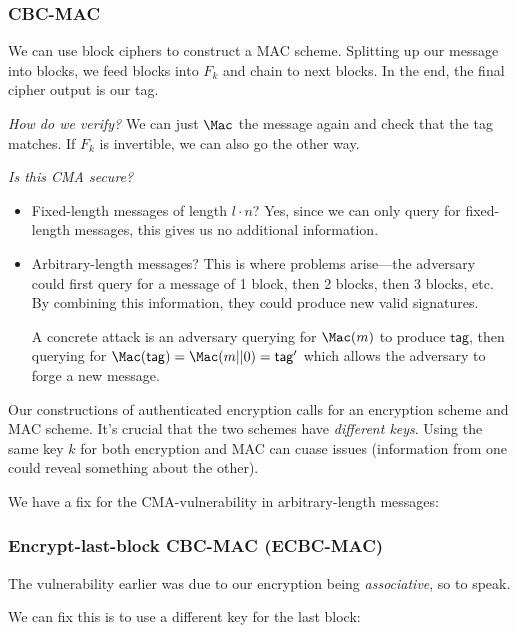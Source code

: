 \subsubsection{CBC-MAC}
We can use block ciphers to construct a MAC scheme. Splitting up our message into blocks, we feed blocks into $F_k$ and chain to next blocks. In the end, the final cipher output is our tag.


\emph{How do we verify?} We can just $\Mac$ the message again and check that the tag matches. If $F_k$ is invertible, we can also go the other way.

\emph{Is this CMA secure?}
\begin{itemize}
    \item
          Fixed-length messages of length $l\cdot n$? Yes, since we can only query for fixed-length messages, this gives us no additional information.
    \item
          Arbitrary-length messages? This is where problems arise---the adversary could first query for a message of 1 block, then 2 blocks, then 3 blocks, etc. By combining this information, they could produce new valid signatures.

          A concrete attack is an adversary querying for $\Mac(m)$ to produce $\mathsf{tag}$, then querying for $\Mac(\mathsf{tag}) = \Mac(m||0) = \mathsf{tag}'$ which allows the adversary to forge a new message.
\end{itemize}

\begin{remark*}
    Our constructions of authenticated encryption calls for an encryption scheme and MAC scheme. It's crucial that the two schemes have \emph{different keys}. Using the same key $k$ for both encryption and MAC can cuase issues (information from one could reveal something about the other).
\end{remark*}

We have a fix for the CMA-vulnerability in arbitrary-length messages:

\subsubsection{Encrypt-last-block CBC-MAC (ECBC-MAC)}
The vulnerability earlier was due to our encryption being \emph{associative}, so to speak.

We can fix this is to use a different key for the last block:

